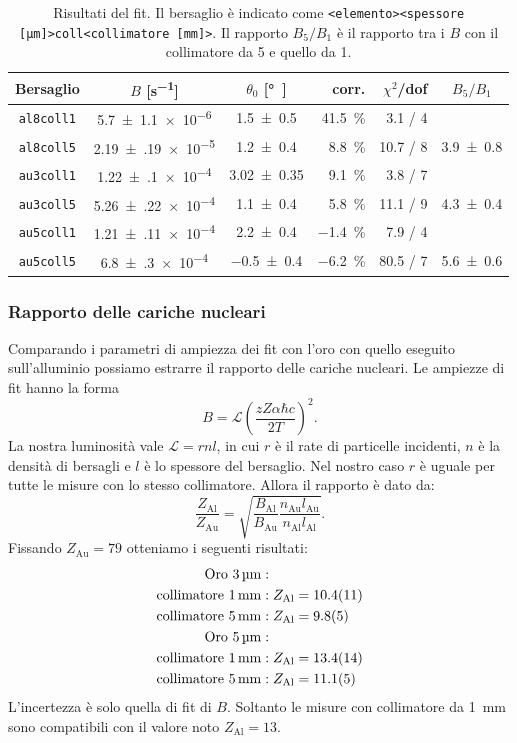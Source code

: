 \begin{table}
	\centering
	\begin{tabular}{cccrrc}
		Bersaglio & $B$ [\si{s^{-1}}] & $\theta_0$ [\si\degree] & corr. & $\chi^2$/dof & $B_5/B_1$ \\
		\hline
		\texttt{al8coll1} & \num{5.7(11)e-6 } & \num{1.5 \pm 0.5  } & \SI{41.5} \% & 3.1 / 4  & \\
		\texttt{al8coll5} & \num{2.19(19)e-5} & \num{1.2 \pm 0.4  } & \SI{8.8 }\%  & 10.7 / 8 & \num{3.9 \pm 0.8} \\
		\texttt{au3coll1} & \num{1.22(10)e-4} & \num{3.02 \pm 0.35} & \SI{9.1 }\%  & 3.8 / 7  & \\
		\texttt{au3coll5} & \num{5.26(22)e-4} & \num{1.1 \pm 0.4  } & \SI{5.8 }\%  & 11.1 / 9 & \num{4.3 \pm 0.4} \\
		\texttt{au5coll1} & \num{1.21(11)e-4} & \num{2.2 \pm 0.4  } & \SI{-1.4} \% & 7.9 / 4  & \\
		\texttt{au5coll5} & \num{6.8(3)e-4  } & \num{-0.5 \pm 0.4 } & \SI{-6.2} \% & 80.5 / 7 & \num{5.6 \pm 0.6} 
	\end{tabular}
	\caption{\label{tab:fit}
	Risultati del fit. Il bersaglio è indicato come
	\texttt{<elemento><spessore [\si{\micro m}]>coll<collimatore [\si{mm}]>}.
	Il rapporto $B_5/B_1$ è il rapporto tra i $B$ con il collimatore da 5 e quello da 1.}
\end{table}

\subsubsection{Rapporto delle cariche nucleari}

Comparando i parametri di ampiezza dei fit con l'oro con quello eseguito sull'alluminio
possiamo estrarre il rapporto delle cariche nucleari.
Le ampiezze di fit hanno la forma
$$ B=\mathcal{L} \left( \frac {zZ\alpha\hbar c} {2T} \right)^2.$$
La nostra luminosità vale $\mathcal{L}=r n l$, in cui $r$ è il rate di particelle incidenti, $n$  è la densità di bersagli e $l$ è lo spessore del bersaglio.
Nel nostro caso $r$ è uguale per tutte le misure con lo stesso collimatore.
Allora il rapporto è dato da:
\begin{equation*}
\frac {Z_{\text{Al}}} {Z_{\text{Au}}}
= \sqrt{ \frac{B_{\text{Al}}}{B_{\text{Au}}} \frac{n_{\text{Au}} l_{\text{Au}}}{n_{\text{Al}} l_{\text{Al}}} }.
\end{equation*}
Fissando $Z_\text{Au}=79$ otteniamo i seguenti risultati:
\begin{align*}
\text{Oro } \SI3{\micro m}&:\\
\text{collimatore } \SI1{mm}&: Z_{\text{Al}}=\num{10.4\pm1.1} \\
\text{collimatore } \SI5{mm}&: Z_{\text{Al}}=\num{9.8\pm0.5} \\
\text{Oro } \SI5{\micro m}&:\\           
\text{collimatore } \SI1{mm}&: Z_{\text{Al}}=\num{13.4\pm1.4} \\
\text{collimatore } \SI5{mm}&: Z_{\text{Al}}=\num{11.1\pm0.5} \\
\end{align*}
L'incertezza è solo quella di fit di $B$.
Soltanto le misure con collimatore da \SI{1}{mm} sono compatibili con il valore noto $Z_\text{Al}=13$.
